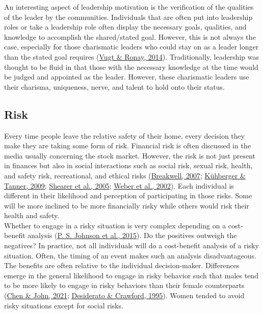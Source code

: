 \documentclass[
  donotrepeattitle,doc, 12pt, a4paper,floatsintext]{apa7}
\begin{document}
An interesting aspect of leadership motivation is the verification of the qualities of the leader by the communities. Individuals that are often put into leadership roles or take a leadership role often display the necessary goals, qualities, and knowledge to accomplish the shared/stated goal. However, this is not always the case, especially for those charismatic leaders who could stay on as a leader longer than the stated goal requires (\protect\hyperlink{ref-vugt2014}{Vugt \& Ronay, 2014}). Traditionally, leadership was thought to be fluid in that those with the necessary knowledge at the time would be judged and appointed as the leader. However, these charismatic leaders use their charisma, uniqueness, nerve, and talent to hold onto their status.
\hypertarget{risk}{%
\subsection{Risk}\label{risk}}
Every time people leave the relative safety of their home, every decision they make they are taking some form of risk. Financial risk is often discussed in the media usually concerning the stock market. However, the risk is not just present in finances but also in social interactions such as social risk, sexual risk, health, and safety risk, recreational, and ethical risks (\protect\hyperlink{ref-breakwell2007}{Breakwell, 2007}; \protect\hyperlink{ref-kuhberger2009}{Kühberger \& Tanner, 2009}; \protect\hyperlink{ref-shearer2005}{Shearer et al., 2005}; \protect\hyperlink{ref-weber2002}{Weber et al., 2002}). Each individual is different in their likelihood and perception of participating in those risks. Some will be more inclined to be more financially risky while others would risk their health and safety.\\
Whether to engage in a risky situation is very complex depending on a cost-benefit analysis (\protect\hyperlink{ref-johnson2015a}{P. S. Johnson et al., 2015}). Do the positives outweigh the negatives? In practice, not all individuals will do a cost-benefit analysis of a risky situation. Often, the timing of an event makes such an analysis disadvantageous. The benefits are often relative to the individual decision-maker. Differences emerge in the general likelihood to engage in risky behavior such that males tend to be more likely to engage in risky behaviors than their female counterparts (\protect\hyperlink{ref-chen2021}{Chen \& John, 2021}; \protect\hyperlink{ref-desiderato1995}{Desiderato \& Crawford, 1995}). Women tended to avoid risky situations except for social risks.
\end{document}

